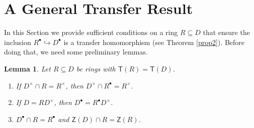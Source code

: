 \documentclass[a4paper, 10pt]{amsart}
\theoremstyle{plain}
\newtheorem{lemma}[theorem]{Lemma}
\theoremstyle{definition}
\theoremstyle{remark}
\numberwithin{equation}{section}
\begin{document}
\section{A General Transfer Result} \label{3}
In this Section we provide sufficient conditions on a ring $R\subseteq D$  that ensure the inclusion $R^\bullet\hookrightarrow D^\bullet$ is a transfer homomorphism (see Theorem \ref{prop2}). Before doing that, we need some preliminary lemmas.
	\begin{lemma}\label{lemma}
		Let $R \subseteq D$ be rings with $\mathsf T(R) =\mathsf T(D)$. 
		\begin{enumerate}[label=\normalfont(\arabic*)]	
			\item If $D^{\times} \cap R= R^{\times}$, then $D^\times \cap R^{\bullet}= R^\times$.
			\item If $D=RD^{\times}$, then $D^{\bullet}=R^{\bullet}D^\times$. 
			\item $D^{\bullet} \cap R = R^{\bullet}$ and $\mathsf Z(D) \cap R =\mathsf Z(R)$.
		\end{enumerate}
	\end{lemma}
	
\end{document}
